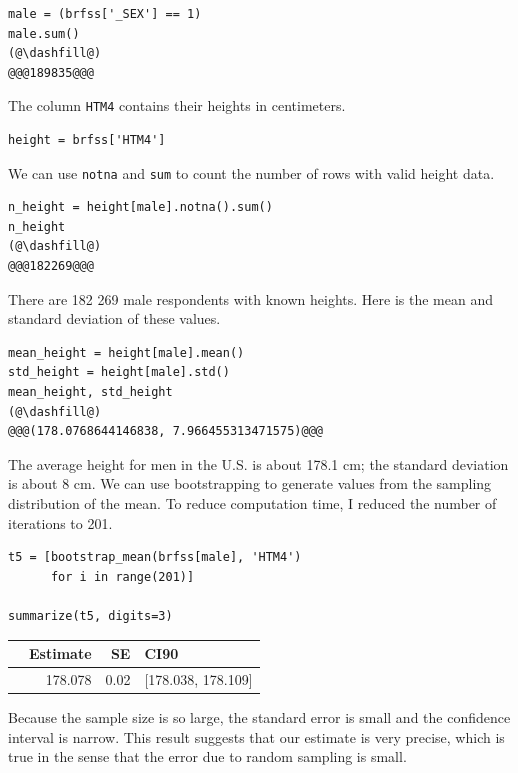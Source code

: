 \begin{lstlisting}[]
male = (brfss['_SEX'] == 1)
male.sum()
(@\dashfill@)
@@@189835@@@
\end{lstlisting}

The column \passthrough{\lstinline!HTM4!} contains their heights in
centimeters.

\begin{lstlisting}[]
height = brfss['HTM4']
\end{lstlisting}

We can use \passthrough{\lstinline!notna!} and
\passthrough{\lstinline!sum!} to count the number of rows with valid
height data.

\begin{lstlisting}[]
n_height = height[male].notna().sum()
n_height
(@\dashfill@)
@@@182269@@@
\end{lstlisting}

There are 182 269 male respondents with known heights. Here is the mean
and standard deviation of these values.

\begin{lstlisting}[]
mean_height = height[male].mean()
std_height = height[male].std()
mean_height, std_height
(@\dashfill@)
@@@(178.0768644146838, 7.966455313471575)@@@
\end{lstlisting}

The average height for men in the U.S. is about 178.1 cm; the standard
deviation is about 8 cm. We can use bootstrapping to generate values
from the sampling distribution of the mean. To reduce computation time,
I reduced the number of iterations to 201.

\begin{lstlisting}[]
t5 = [bootstrap_mean(brfss[male], 'HTM4')
      for i in range(201)]

summarize(t5, digits=3)
\end{lstlisting}

\begin{tabular}{lrrl}
\midrule
{} &  Estimate &    SE &                CI90 \\
\midrule
{} &   178.078 &  0.02 &  [178.038, 178.109] \\
\midrule
\end{tabular}

Because the sample size is so large, the standard error is small and the
confidence interval is narrow. This result suggests that our estimate is
very precise, which is true in the sense that the error due to random
sampling is small.

